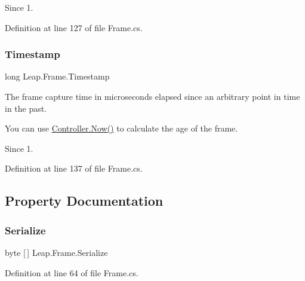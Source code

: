 \begin{DoxySince}{Since}
1. 
\end{DoxySince}


Definition at line 127 of file Frame.\+cs.

\mbox{\label{class_leap_1_1_frame_a1e1b235fcb1f454ee20aa82c5342c987}} 
\subsubsection{\texorpdfstring{Timestamp}{Timestamp}}
{\footnotesize\ttfamily long Leap.\+Frame.\+Timestamp}



The frame capture time in microseconds elapsed since an arbitrary point in time in the past. 

You can use \mbox{\hyperlink{class_leap_1_1_controller_a57650944fa868adcfe4cea8608af5a03}{Controller.\+Now()}} to calculate the age of the frame.

\begin{DoxySince}{Since}
1. 
\end{DoxySince}


Definition at line 137 of file Frame.\+cs.



\subsection{Property Documentation}
\mbox{\label{class_leap_1_1_frame_a4c3654c5bf0c7d376502763d98cf9ca6}} 
\subsubsection{\texorpdfstring{Serialize}{Serialize}}
{\footnotesize\ttfamily byte \mbox{[}$\,$\mbox{]} Leap.\+Frame.\+Serialize\hspace{0.3cm}{\ttfamily [get]}}



Definition at line 64 of file Frame.\+cs.

\mbox{\label{class_leap_1_1_frame_a91aa5f4c3fd9d1c649a4f4333d09cf43}} 
